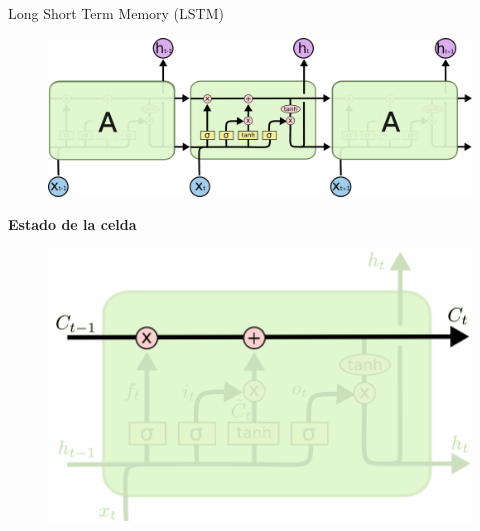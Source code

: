 
\begin{frame}{Long Short Term Memory (LSTM)}
\begin{overprint}
    
    
    \begin{figure}
            \centering
            \vspace{1cm}
            \includegraphics[keepaspectratio=true,height=1\paperheight,width=1\linewidth]{Images/lstmg.png}
        \end{figure}
        \begin{center} \textbf{Estado de la celda} \end{center}
        \begin{figure}
            \centering
            \includegraphics[keepaspectratio=true,height=0.7\paperheight,width=0.7\linewidth]{Images/estado.png}
        \end{figure}


\end{overprint}
\end{frame}
